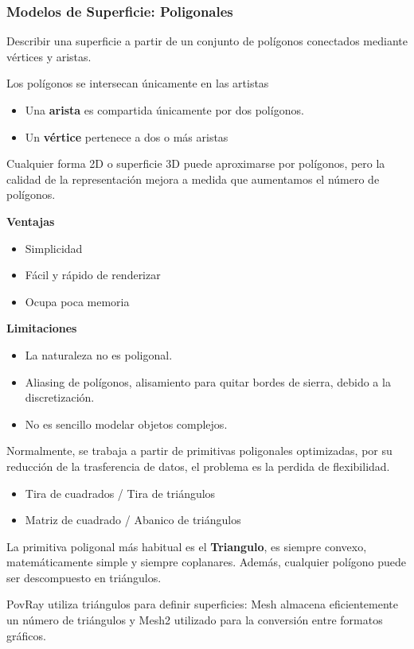 \subsubsection{Modelos de Superficie: Poligonales}
Describir una superficie a partir de un conjunto de polígonos conectados mediante vértices y aristas.

Los polígonos se intersecan únicamente en las artistas
\begin{itemize}
    \item Una \textbf{arista} es compartida únicamente por dos polígonos.
    \item Un \textbf{vértice} pertenece a dos o más aristas
\end{itemize}

Cualquier forma 2D o superficie 3D puede aproximarse por polígonos, pero la calidad de la representación mejora a medida que aumentamos el número de polígonos.

\textbf{Ventajas}
\begin{itemize}
    \item Simplicidad 
    \item Fácil y rápido de renderizar 
    \item Ocupa poca memoria
\end{itemize}

\textbf{Limitaciones}
\begin{itemize}
    \item La naturaleza no es poligonal.
    \item Aliasing de polígonos, alisamiento para quitar bordes de sierra, debido a la discretización.
    \item No es sencillo modelar objetos complejos.
\end{itemize}

Normalmente, se trabaja a partir de primitivas poligonales optimizadas, por su reducción de la trasferencia de datos, el problema es la perdida de flexibilidad.
\begin{itemize}
    \item Tira de cuadrados / Tira de triángulos
    \item Matriz de cuadrado / Abanico de triángulos
\end{itemize}

La primitiva poligonal más habitual es el \textbf{Triangulo}, es siempre convexo, matemáticamente simple y siempre coplanares. Además, cualquier polígono puede ser descompuesto en triángulos.

PovRay utiliza triángulos para definir superficies: Mesh almacena eficientemente un número de triángulos y Mesh2 utilizado para la conversión entre formatos gráficos. 

